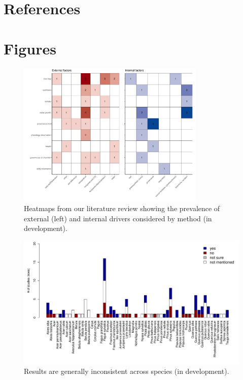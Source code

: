 \documentclass[11pt]{article}
\begin{document}
\clearpage
\section*{References}



\section*{Figures}


\clearpage
\begin{figure}[h!]
\includegraphics[width=0.8\textwidth]{..//figures/heatmaps/heatmap_combined_endo&exo.pdf}
\caption{Heatmaps from our literature review showing the prevalence of external (left) and internal drivers considered by method (in development).}
\label{fig:heatmapssupp}
\end{figure}


\clearpage
\begin{figure}[h!]
\includegraphics[width=1\textwidth]{..//figures/speciesnums_finds.pdf}
\caption{Results are generally inconsistent across species (in development).}
\label{fig:sppfinds}
\end{figure}
\end{document}
